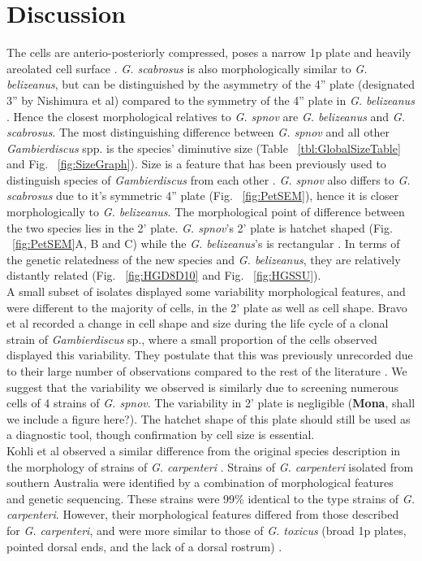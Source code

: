 \documentclass[12pt]{article}
\begin{document}
\newpage
\section{Discussion}
The cells are anterio-posteriorly compressed, poses a narrow 1p plate and heavily areolated cell surface \citep{litaker2009taxonomy}. \emph{G. scabrosus} is also morphologically similar to \emph{G. belizeanus}, but can be distinguished by the asymmetry of the 4'' plate (designated 3'' by Nishimura et al) compared to the symmetry of the 4'' plate in \emph{G. belizeanus} \citep{nishimura2014morphology}. Hence the closest morphological relatives to \emph{G. spnov} are \emph{G. belizeanus} and \emph{G. scabrosus}. The most distinguishing difference between \emph{G. spnov} and all other \emph{Gambierdiscus} spp. is the species' diminutive size (Table ~\ref{tbl:GlobalSizeTable} and Fig. ~\ref{fig:SizeGraph}). Size is a feature that has been previously used to distinguish species of \emph{Gambierdiscus} from each other \citep{litaker2009taxonomy}. 
\emph{G. spnov} also differs to \emph{G. scabrosus} due to it's symmetric 4'' plate (Fig. ~\ref{fig:PetSEM}), hence it is closer morphologically to \emph{G. belizeanus}. The morphological point of difference between the two species lies in the 2' plate. \emph{G. spnov}'s 2' plate is hatchet shaped (Fig. ~\ref{fig:PetSEM}A, B and C) while the \emph{G. belizeanus}'s is rectangular \citep{faust1995observation}. In terms of the genetic relatedness of the new species and \textit{G. belizeanus}, they are relatively distantly related (Fig. ~\ref{fig:HGD8D10} and Fig. ~\ref{fig:HGSSU}). \\
A small subset of isolates displayed some variability morphological features, and were different to the majority of cells, in the 2' plate as well as cell shape. Bravo et al recorded a change in cell shape and size during the life cycle of a clonal strain of \emph{Gambierdiscus} sp., where a small proportion of the cells observed displayed this variability. They postulate that this was previously unrecorded due to their large number of observations compared to the rest of the literature \citep{bravo2014cellular}. We suggest that the variability we observed is similarly due to screening numerous cells of 4 strains of \emph{G. spnov}. The variability in 2' plate is negligible (\textbf{Mona}, shall we include a figure here?). The hatchet shape of this plate should still be used as a diagnostic tool, though confirmation by cell size is essential.\\
Kohli et al observed a similar difference from the original species description in the morphology of strains of  \emph{G. carpenteri} \citep{kohli2014high}. Strains of \emph{G. carpenteri} isolated from southern Australia were identified by a combination of morphological features and genetic sequencing. These strains were 99\% identical to the type strains of \textit{G. carpenteri}. However, their morphological features differed from those described for \textit{G. carpenteri}, and were more similar to those of \emph{G. toxicus} (broad 1p plates, pointed dorsal ends, and the lack of a dorsal rostrum) \citep{kohli2014high,litaker2009taxonomy}.
\end{document}
